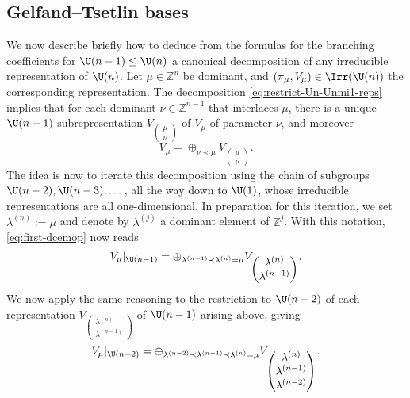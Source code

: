 \documentclass[reqno]{amsart} 
\begin{document}
\subsection{Gelfand--Tsetlin bases}
We now describe briefly how to deduce from the formulas for the branching coefficients for $\U(n-1) \leq \U(n)$ a canonical decomposition of any irreducible representation of $\U(n)$.  Let $\mu \in \mathbb{Z}^n$ be dominant, and $(\pi_\mu,V_\mu) \in \Irr(\U(n))$ the corresponding representation.  The decomposition \eqref{eq:restrict-Un-Unmi1-reps} implies that for each dominant $\nu \in \mathbb{Z}^{n-1}$ that interlaces $\mu$, there is a unique $\U(n-1)$-subrepresentation $V _{
\begin{pmatrix}
    \mu   \\
    \nu
  \end{pmatrix}
}$ of $V_{\mu}$ of parameter $\nu$, and moreover
\begin{equation}\label{eq:first-dcemop}
  V_\mu = \oplus_{\nu \prec \mu} V _{
\begin{pmatrix}
      \mu   \\
      \nu 
    \end{pmatrix}
}.
\end{equation}
The idea is now to iterate this decomposition using the chain of subgroups $\U(n-2), \U(n-3), \dotsc$, all the way down to $\U(1)$, whose irreducible representations are all one-dimensional.  In preparation for this iteration, we set $\lambda^{(n)} := \mu$ and denote by $\lambda^{(j)}$ a dominant element of $\mathbb{Z}^{j}$.  With this notation, \eqref{eq:first-dcemop} now reads
\begin{equation*}
  V_\mu |_{\U(n-1)}
  =
  \oplus_{\lambda^{(n-1)} \prec \lambda^{(n)} = \mu }
  V _{
    \begin{pmatrix}
      \lambda^{(n)}  \\
      \lambda^{(n-1)}
    \end{pmatrix}
  }.
\end{equation*}
We now apply the same reasoning to the restriction to $\U(n-2)$ of each representation $V _{
\begin{pmatrix}
    \lambda^{(n)}  \\
    \lambda^{(n-1)}
  \end{pmatrix}
}$ of $\U(n-1)$ arising above, giving
\begin{equation*}
  V_\mu |_{\U(n-2)}
  =
  \oplus_{\lambda^{(n-2)} \prec \lambda^{(n-1)} \prec \lambda^{(n)} = \mu }
  V _{
    \begin{pmatrix}
      \lambda^{(n)}  \\
      \lambda^{(n-1)} \\
      \lambda^{(n-2)}
    \end{pmatrix}
  }.
\end{equation*}
\end{document}
